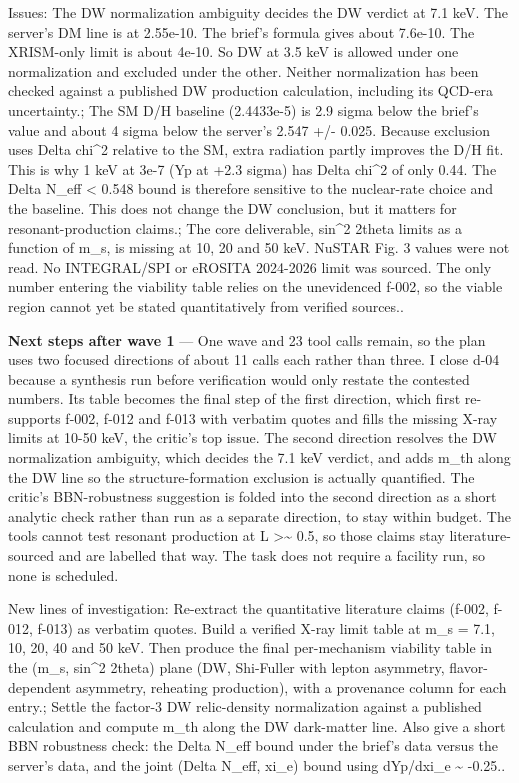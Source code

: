 \documentclass[11pt,a4paper]{article}
\begin{document}
Issues: The DW normalization ambiguity decides the DW verdict at 7.1 keV. The server's DM line is at 2.55e-10. The brief's formula gives about 7.6e-10. The XRISM-only limit is about 4e-10. So DW at 3.5 keV is allowed under one normalization and excluded under the other. Neither normalization has been checked against a published DW production calculation, including its QCD-era uncertainty.; The SM D/H baseline (2.4433e-5) is 2.9 sigma below the brief's value and about 4 sigma below the server's 2.547 +/- 0.025. Because exclusion uses Delta chi\textasciicircum{}2 relative to the SM, extra radiation partly improves the D/H fit. This is why 1 keV at 3e-7 (Yp at +2.3 sigma) has Delta chi\textasciicircum{}2 of only 0.44. The Delta N\_eff \textless{} 0.548 bound is therefore sensitive to the nuclear-rate choice and the baseline. This does not change the DW conclusion, but it matters for resonant-production claims.; The core deliverable, sin\textasciicircum{}2 2theta limits as a function of m\_s, is missing at 10, 20 and 50 keV. NuSTAR Fig. 3 values were not read. No INTEGRAL/SPI or eROSITA 2024-2026 limit was sourced. The only number entering the viability table relies on the unevidenced f-002, so the viable region cannot yet be stated quantitatively from verified sources..

\textbf{Next steps after wave 1} --- One wave and 23 tool calls remain, so the plan uses two focused directions of about 11 calls each rather than three. I close d-04 because a synthesis run before verification would only restate the contested numbers. Its table becomes the final step of the first direction, which first re-supports f-002, f-012 and f-013 with verbatim quotes and fills the missing X-ray limits at 10-50 keV, the critic's top issue. The second direction resolves the DW normalization ambiguity, which decides the 7.1 keV verdict, and adds m\_th along the DW line so the structure-formation exclusion is actually quantified. The critic's BBN-robustness suggestion is folded into the second direction as a short analytic check rather than run as a separate direction, to stay within budget. The tools cannot test resonant production at L \textgreater{}\textasciitilde{} 0.5, so those claims stay literature-sourced and are labelled that way. The task does not require a facility run, so none is scheduled.

New lines of investigation: Re-extract the quantitative literature claims (f-002, f-012, f-013) as verbatim quotes. Build a verified X-ray limit table at m\_s = 7.1, 10, 20, 40 and 50 keV. Then produce the final per-mechanism viability table in the (m\_s, sin\textasciicircum{}2 2theta) plane (DW, Shi-Fuller with lepton asymmetry, flavor-dependent asymmetry, reheating production), with a provenance column for each entry.; Settle the factor-3 DW relic-density normalization against a published calculation and compute m\_th along the DW dark-matter line. Also give a short BBN robustness check: the Delta N\_eff bound under the brief's data versus the server's data, and the joint (Delta N\_eff, xi\_e) bound using dYp/dxi\_e \textasciitilde{} -0.25..
\end{document}

